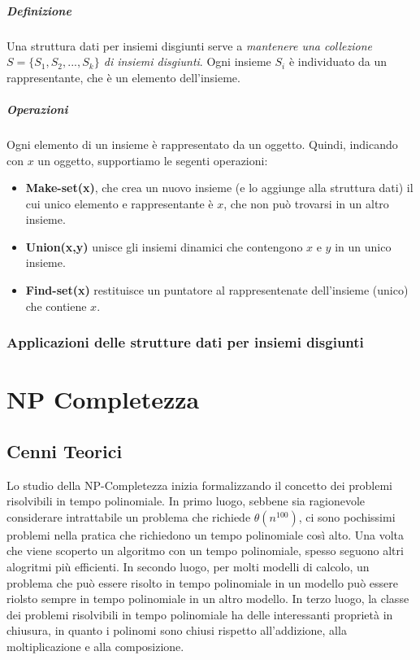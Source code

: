 \documentclass[12pt, a4paper, openany]{book}
\begin{document}
	\paragraph{Definizione}
	Una struttura dati per insiemi disgiunti serve a \emph{mantenere una collezione $S = \{S_1,S_2,...,S_k\}$ di insiemi disgiunti}.
	Ogni insieme $S_i$ è individuato da un rappresentante, che è un elemento dell'insieme.

	\paragraph{Operazioni}
	Ogni elemento di un insieme è rappresentato da un oggetto.
	Quindi, indicando con $x$ un oggetto, supportiamo le segenti operazioni:
	\begin{itemize}
		\item \textbf{Make-set(x)}, che crea un nuovo insieme (e lo aggiunge alla struttura dati) il cui unico elemento e rappresentante è $x$, che non può trovarsi in un altro insieme.
		\item \textbf{Union(x,y)} unisce gli insiemi dinamici che contengono $x$ e $y$ in un unico insieme.
		\item \textbf{Find-set(x)} restituisce un puntatore al rappresentenate dell'insieme (unico) che contiene $x$.
	\end{itemize}
	\subsection*{Applicazioni delle strutture dati per insiemi disgiunti}


	\chapter{NP Completezza} %
	\section{Cenni Teorici}
	Lo studio della NP-Completezza inizia formalizzando il concetto dei problemi risolvibili in tempo polinomiale.
	In primo luogo, sebbene sia ragionevole considerare intrattabile un problema che richiede $\theta(n^{100})$, ci sono pochissimi problemi nella pratica che richiedono un tempo polinomiale così alto.
	Una volta che viene scoperto un algoritmo con un tempo polinomiale, spesso seguono altri alogritmi più efficienti.
	In secondo luogo, per molti modelli di calcolo, un problema che può essere risolto in tempo polinomiale in un modello può essere riolsto sempre in tempo polinomiale in un altro modello.
	In terzo luogo, la classe dei problemi risolvibili in tempo polinomiale ha delle interessanti proprietà in chiusura, in quanto i polinomi sono chiusi rispetto all'addizione, alla moltiplicazione e alla composizione.
\end{document}
